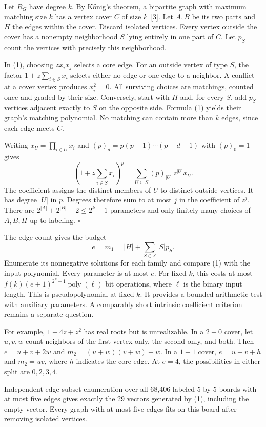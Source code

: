 \documentclass[12pt,letterpaper]{article}
\newcommand{\head}[1]{\par\vspace{5pt}{\large\bfseries\color{dark}#1}\par}
\newcommand{\eop}{\hfill$\square$}
\begin{document}
Let $R_G$ have degree $k$. By K\H onig's theorem, a bipartite graph with maximum matching size $k$ has a vertex cover $C$ of size $k$~[3]. Let $A,B$ be its two parts and $H$ the edges within the cover. Discard isolated vertices. Every vertex outside the cover has a nonempty neighborhood $S$ lying entirely in one part of $C$. Let $p_S$ count the vertices with precisely this neighborhood.

In (1), choosing $z x_i x_j$ selects a core edge. For an outside vertex of type $S$, the factor $1+z\sum_{i\in S}x_i$ selects either no edge or one edge to a neighbor. A conflict at a cover vertex produces $x_i^2=0$. All surviving choices are matchings, counted once and graded by their size. Conversely, start with $H$ and, for every $S$, add $p_S$ vertices adjacent exactly to $S$ on the opposite side. Formula (1) yields their graph's matching polynomial. No matching can contain more than $k$ edges, since each edge meets $C$.

Writing $x_U=\prod_{i\in U}x_i$ and $(p)_d=p(p-1)\cdots(p-d+1)$ with $(p)_0=1$ gives
\[
 \left(1+z\sum_{i\in S}x_i\right)^p
    =\sum_{U\subseteq S}(p)_{|U|}\,z^{|U|}x_U .
\]
The coefficient assigns the distinct members of $U$ to distinct outside vertices. It has degree $|U|$ in $p$. Degrees therefore sum to at most $j$ in the coefficient of $z^j$. There are $2^{|A|}+2^{|B|}-2\le2^k-1$ parameters and only finitely many choices of $A,B,H$ up to labeling. \eop

\head{An arithmetic test}
The edge count gives the budget
\[
 e=m_1=|H|+\sum_{S\in\mathcal S}|S|p_S .
\]
Enumerate its nonnegative solutions for each family and compare (1) with the input polynomial. Every parameter is at most $e$. For fixed $k$, this costs at most $f(k)(e+1)^{2^k-1}\operatorname{poly}(\ell)$ bit operations, where $\ell$ is the binary input length. This is pseudopolynomial at fixed $k$. It provides a bounded arithmetic test with auxiliary parameters. A comparably short intrinsic coefficient criterion remains a separate question.

For example, $1+4z+z^2$ has real roots but is unrealizable. In a $2+0$ cover, let $u,v,w$ count neighbors of the first vertex only, the second only, and both. Then $e=u+v+2w$ and $m_2=(u+w)(v+w)-w$. In a $1+1$ cover, $e=u+v+h$ and $m_2=uv$, where $h$ indicates the core edge. At $e=4$, the possibilities in either split are $0,2,3,4$.

Independent edge-subset enumeration over all 68,406 labeled $5$ by $5$ boards with at most five edges gives exactly the 29 vectors generated by (1), including the empty vector. Every graph with at most five edges fits on this board after removing isolated vertices.
\end{document}
